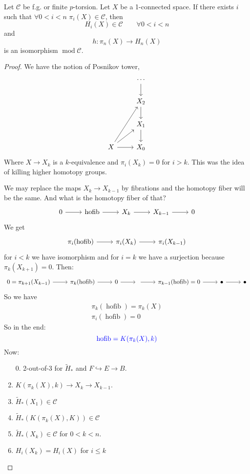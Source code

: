 \documentclass{article}
\newcommand{\Cc}{\mathcal{C}}
\renewcommand{\mod}{\operatorname{mod}}
\begin{document}
\begin{thm}[mod $\Cc$ Hurewicz theorem]
	Let $\mathcal{C}$ be f.g. or finite $p$-torsion. Let $X$ be a 1-connected space. If there exists $i$ such that $\forall 0<i<n$ $\pi_{i}(X)\in \mathcal{C}$, then
	\[H_{i}(X)\in \mathcal{C}\qquad \forall 0<i<n\]
	and
	\[h:\pi_{n}(X)\to H_{n}(X)\]
	is an isomorphism $\mod \mathcal{C}$.
\end{thm}
\begin{proof}
We have the notion of Posnikov tower,
\[\begin{tikzcd}
	&\cdots\arrow[d]\\
	&X_2\arrow[d]\\
	&X_1\arrow[d]\\
	X\arrow[uur]\arrow[ur]\arrow[r]&X_0
\end{tikzcd}\]
Where $X\to X_k$ is a $k$-equivalence and $\pi_{i}(X_k)=0$ for $i>k$. This was the idea of killing higher homotopy groups.

We may replace the maps $X_k\to X_{k-1}$ by fibrations and the homotopy fiber will be the same. And what is the homotopy fiber of that?
\[\begin{tikzcd}
	0\arrow[r]&\operatorname{hofib}\arrow[r]&X_k\arrow[r]&X_{k-1}\arrow[r]&0
\end{tikzcd}\]
We get
\[\begin{tikzcd}
	\pi_{i}(\operatorname{hofib})\arrow[r]&\pi_{i}(X_k)\arrow[r]&\pi_{i}(X_{k-1})
\end{tikzcd}\]
for $i<k$ we have isomorphism and for $ i=k$ we have a surjection because $\pi_{k}(X_{k+1})=0$. Then:
\[\begin{tikzcd}
	0=\pi_{k+1}(X_{k-1})\arrow[r]&\pi_{k}(\operatorname{hofib})\arrow[r]&0\arrow[r]&\arrow[r]&\pi_{k-1}(\operatorname{hofib})=0\arrow[r]&\bullet\arrow[r]&\bullet
\end{tikzcd}\]
So we have
\begin{align*}
	\pi_{k}(\operatorname{hofib})=\pi_{k}(X)\\
	\pi_{i}(\operatorname{hofib})=0
\end{align*}
So in the end:
\[{\color{blue}\operatorname{hofib}=K(\pi_{k}(X),k) }\]
Now:
\begin{enumerate}
	\item[0.] 2-out-of-3 for $\widetilde{H}_*$ and $F\hookrightarrow E\to B$.
	\item $K(\pi_{k}(X),k)\to X_k\to X_{k-1}$.
	\item $\widetilde{H}_{*}(X_1)\in \mathcal{C}$ 
	\item $\widetilde{H}_{*}(K(\pi_{k}(X),K))\in \mathcal{C}$ 
	\item $\widetilde{H}_{*}(X_k)\in \mathcal{C}$ for $0<k<n$.
	\item $H_{i}(X_k)=H_{i}(X)$ for $i\leq k$
		

\end{enumerate}
\end{proof}
\end{document}
